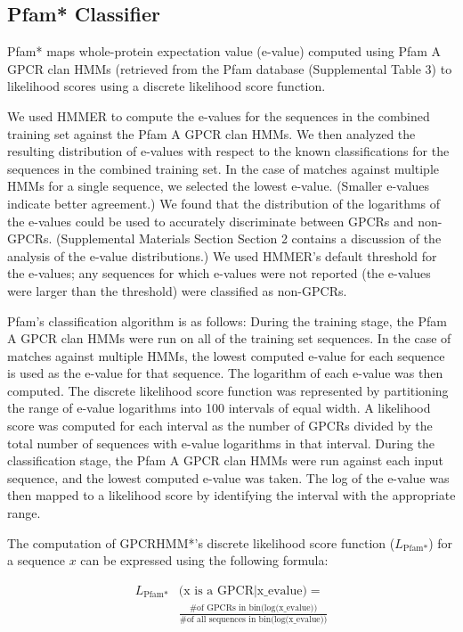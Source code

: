 \subsection{Pfam* Classifier}
Pfam* maps whole-protein expectation value (e-value) computed using Pfam A GPCR clan HMMs (retrieved from the Pfam database \cite{Punta2012} (Supplemental Table 3) to likelihood scores using a discrete likelihood score function.

We used HMMER \cite{Finn2011} to compute the e-values for the sequences in the combined training set against the Pfam A GPCR clan HMMs. We then analyzed the resulting distribution of e-values with respect to the known classifications for the sequences in the combined training set.  In the case of matches against multiple HMMs for a single sequence, we selected the lowest e-value.  (Smaller e-values indicate better agreement.)  We found that the distribution of the logarithms of the e-values could be used to accurately discriminate between GPCRs and non-GPCRs. (Supplemental Materials Section Section 2 contains a discussion of the analysis of the e-value distributions.) We used HMMER's default threshold for the e-values; any sequences for which e-values were not reported (the e-values were larger than the threshold) were classified as non-GPCRs.

Pfam's classification algorithm is as follows: During the training stage, the Pfam A GPCR clan HMMs were run on all of the training set sequences.  In the case of matches against multiple HMMs, the lowest computed e-value for each sequence is used as the e-value for that sequence.  The logarithm of each e-value was then computed.  The discrete likelihood score function was represented by partitioning the range of e-value logarithms into 100 intervals of equal width.  A likelihood score was computed for each interval as the number of GPCRs divided by the total number of sequences with e-value logarithms in that interval.  During the classification stage, the Pfam A GPCR clan HMMs were run against each input sequence, and the lowest computed e-value was taken.  The log of the e-value was then mapped to a likelihood score by identifying the interval with the appropriate range. 

The computation of GPCRHMM*'s discrete likelihood score function ($L_{\text{Pfam*}}$) for a sequence $x$ can be expressed using the following formula: 


\begin{align*}
L_{\text{Pfam*}}&\text{(x is a GPCR} | \text{x\_evalue)} =\\
&\frac{\text{\# of GPCRs in bin(log(x\_evalue))}}{\text{\# of all sequences in bin(log(x\_evalue))}}
\end{align*}

